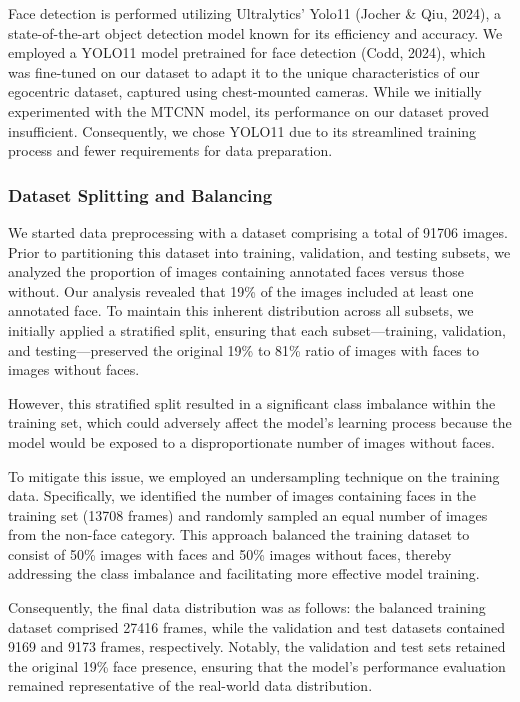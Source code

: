 \documentclass[
  man,floatsintext]{apa6}
\begin{document}
Face detection is performed utilizing Ultralytics' Yolo11 (Jocher \& Qiu, 2024), a state-of-the-art object detection model known for its efficiency and accuracy. We employed a YOLO11 model pretrained for face detection (Codd, 2024), which was fine-tuned on our dataset to adapt it to the unique characteristics of our egocentric dataset, captured using chest-mounted cameras. While we initially experimented with the MTCNN model, its performance on our dataset proved insufficient. Consequently, we chose YOLO11 due to its streamlined training process and fewer requirements for data preparation.

\subsubsection{Dataset Splitting and Balancing}\label{dataset-splitting-and-balancing}

We started data preprocessing with a dataset comprising a total of 91706 images. Prior to partitioning this dataset into training, validation, and testing subsets, we analyzed the proportion of images containing annotated faces versus those without. Our analysis revealed that 19\% of the images included at least one annotated face. To maintain this inherent distribution across all subsets, we initially applied a stratified split, ensuring that each subset---training, validation, and testing---preserved the original 19\% to 81\% ratio of images with faces to images without faces.

However, this stratified split resulted in a significant class imbalance within the training set, which could adversely affect the model's learning process because the model would be exposed to a disproportionate number of images without faces.

To mitigate this issue, we employed an undersampling technique on the training data. Specifically, we identified the number of images containing faces in the training set (13708 frames) and randomly sampled an equal number of images from the non-face category. This approach balanced the training dataset to consist of 50\% images with faces and 50\% images without faces, thereby addressing the class imbalance and facilitating more effective model training.

Consequently, the final data distribution was as follows: the balanced training dataset comprised 27416 frames, while the validation and test datasets contained 9169 and 9173 frames, respectively. Notably, the validation and test sets retained the original 19\% face presence, ensuring that the model's performance evaluation remained representative of the real-world data distribution.
\end{document}
